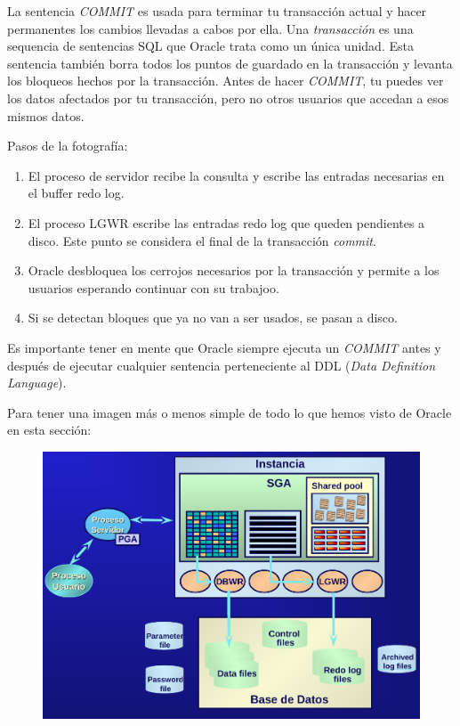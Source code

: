 La sentencia \textit{COMMIT} es usada para terminar tu transacción actual y hacer permanentes los cambios llevadas a cabos por ella. Una \textit{transacción} es una sequencia de sentencias SQL que Oracle trata como un única unidad. Esta sentencia también borra todos los puntos de guardado en la transacción y levanta los bloqueos hechos por la transacción. Antes de hacer \textit{COMMIT}, tu puedes ver los datos afectados por tu transacción, pero no otros usuarios que accedan a esos mismos datos.  

Pasos de la fotografía:
\begin{enumerate}
\item El proceso de servidor recibe la consulta y escribe las entradas necesarias en el buffer redo log.
\item El proceso LGWR escribe las entradas redo log que queden pendientes a disco. Este punto se considera el final de la transacción \textit{commit}.
\item Oracle desbloquea los cerrojos necesarios por la transacción y permite a los usuarios esperando continuar con su trabajoo.
\item Si se detectan bloques que ya no van a ser usados, se pasan a disco.
\end{enumerate}

Es importante tener en mente que Oracle siempre ejecuta un \textit{COMMIT} antes y después de ejecutar cualquier sentencia perteneciente al DDL (\textit{Data Definition Language}).

Para tener una imagen más o menos simple de todo lo que hemos visto de Oracle en esta sección:

\begin{figure}[H]
  \center
  \includegraphics[scale=0.3]{img/p11.png}
\end{figure}

